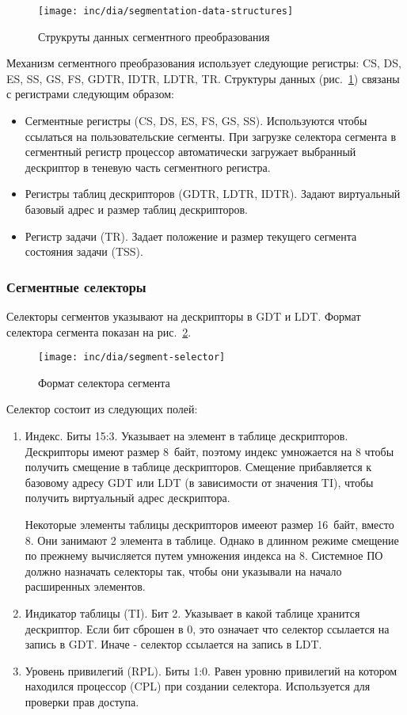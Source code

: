 \begin{figure}[ht!]
  \centering
  \texttt{[image: inc/dia/segmentation-data-structures]}
  \caption{Струкруты данных сегментного преобразования}
  \label{fig:segmentation-data-structures}
\end{figure}

Механизм сегментного преобразования использует следующие регистры: CS, DS, ES, SS, GS, FS, GDTR, IDTR, LDTR, TR.
Структуры данных (рис.~\ref{fig:segmentation-data-structures}) связаны с регистрами следующим образом:
\begin{itemize}
	\item Сегментные регистры (CS, DS, ES, FS, GS, SS). Используются чтобы ссылаться
		на пользовательские сегменты. При загрузке селектора сегмента в сегментный регистр процессор
		автоматически загружает выбранный дескриптор в теневую часть сегментного регистра.
	\item Регистры таблиц дескрипторов (GDTR, LDTR, IDTR). Задают виртуальный базовый адрес и размер таблиц дескрипторов.
	\item Регистр задачи (TR). Задает положение и размер текущего сегмента состояния задачи (TSS).
\end{itemize}

\subsubsection*{Сегментные селекторы}
Селекторы сегментов указывают на дескрипторы в GDT и LDT.
Формат селектора сегмента показан на рис.~\ref{fig:segment-selector}.

\begin{figure}[ht!]
  \centering
  \texttt{[image: inc/dia/segment-selector]}
  \caption{Формат селектора сегмента}
  \label{fig:segment-selector}
\end{figure}

Селектор состоит из следующих полей:
\begin{enumerate}[1.]
\item Индекс. Биты 15:3. Указывает на элемент в таблице дескрипторов.
	Дескрипторы имеют размер 8~байт, поэтому индекс умножается на 8
	чтобы получить смещение в таблице дескрипторов. Смещение прибавляется
	к базовому адресу GDT или LDT (в зависимости от значения TI), чтобы получить
	виртуальный адрес дескриптора.

	Некоторые элементы таблицы дескрипторов имееют размер 16~байт, вместо 8.
	Они занимают 2 элемента в таблице. Однако в длинном режиме смещение по
	прежнему вычисляется путем умножения индекса на 8. Системное ПО должно
	назначать селекторы так, чтобы они указывали на начало расширенных элементов.
\item Индикатор таблицы (TI). Бит 2. Указывает в какой таблице хранится дескриптор.
	Если бит сброшен в 0, это означает что селектор ссылается на запись в GDT.
	Иначе - селектор ссылается на запись в LDT.
\item Уровень привилегий (RPL). Биты 1:0. Равен уровню привилегий на котором
	находился процессор (CPL) при создании селектора. Используется для проверки прав доступа.
\end{enumerate}

